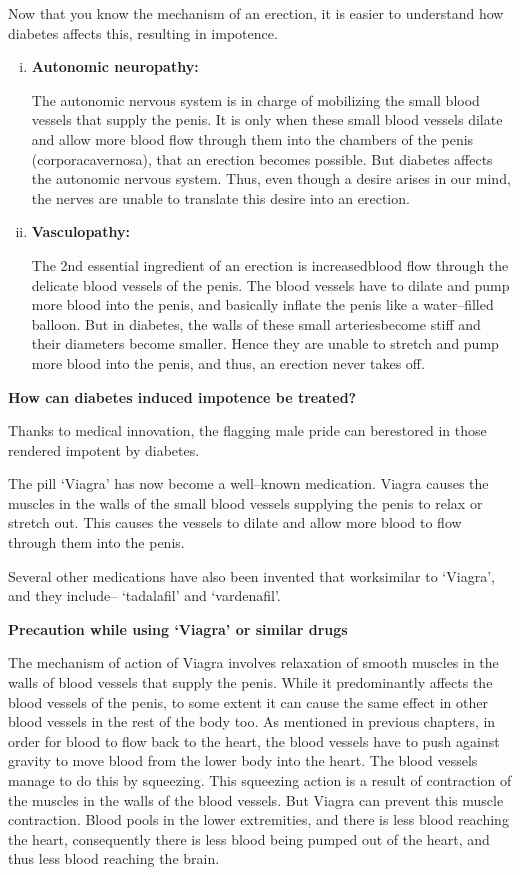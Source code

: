 \begin{enumerate}
Now that you know the mechanism of an erection, it is easier to understand how diabetes affects this, resulting in impotence.
\begin{enumerate}[i.]
\itemsep=0pt
 \item \textbf{Autonomic neuropathy:}

The autonomic nervous system is in charge of mobilizing the small blood vessels that supply the penis. It is only when these small blood vessels dilate and allow more blood flow through them into the chambers of the penis (corpora\break cavernosa), that an erection becomes possible. But diabetes affects the autonomic nervous system. Thus, even though a desire arises in our mind, the nerves are unable to translate this desire into an erection.

 \item \textbf{Vasculopathy:}

The 2nd essential ingredient of an erection is increased\break blood flow through the delicate blood vessels of the penis. The blood vessels have to dilate and pump more blood into the penis, and basically inflate the penis like a water–filled balloon. But in diabetes, the walls of these small arteries\break become stiff and their diameters become smaller. Hence they are unable to stretch and pump more blood into the penis, and thus, an erection never takes off.
\end{enumerate}
\end{enumerate}
\vspace{-\topsep}

\noindent\textbf{How can diabetes induced impotence be treated?}

Thanks to medical innovation, the flagging male pride can be\break restored in those rendered impotent by diabetes.

The pill ‘Viagra’ has now become a well–known medication. Viagra causes the muscles in the walls of the small blood vessels supplying the penis to relax or stretch out. This causes the vessels to dilate and allow more blood to flow through them into the penis.

Several other medications have also been invented that work\break similar to ‘Viagra’, and they include– ‘tadalafil’ and ‘vardenafil’.

\noindent\textbf{Precaution while using ‘Viagra’ or similar drugs}

The mechanism of action of Viagra involves relaxation of smooth muscles in the walls of blood vessels that supply the penis. While it predominantly affects the blood vessels of the penis, to some extent it can cause the same effect in other blood vessels in the rest of the body too. As mentioned in previous chapters, in order for blood to flow back to the heart, the blood vessels have to push against gravity to move blood from the lower body into the heart. The blood vessels manage to do this by squeezing. This squeezing action is a result of contraction of the muscles in the walls of the blood vessels. But Viagra can prevent this muscle contraction. Blood pools in the lower extre\-mi\-ties, and there is less blood reaching the heart, consequently there is less blood being pumped out of the heart, and thus less blood reaching the brain.

